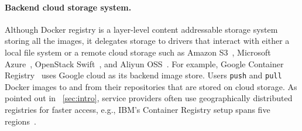 \paragraph{Backend cloud storage system.}
Although Docker registry is a layer-level content addressable storage system storing all the images,
it delegates storage to drivers that interact with either a local file system or a remote cloud storage such as Amazon S3~\cite{s3}, Microsoft Azure~\cite{azure}, OpenStack Swift~\cite{swift}, and Aliyun OSS~\cite{aliyun}. 
For example, Google Container Registry~\cite{GoogleContainerRegistry} uses Google cloud 
as its backend image store.
Users \texttt{push} and \texttt{pull} Docker images to and from their repositories that are stored on cloud storage. As pointed out in ~\cref{sec:intro}, service providers often use geographically distributed registries for faster access, e.g., IBM's Container Registry setup spans five regions~\cite{dockerworkload}. 

%


